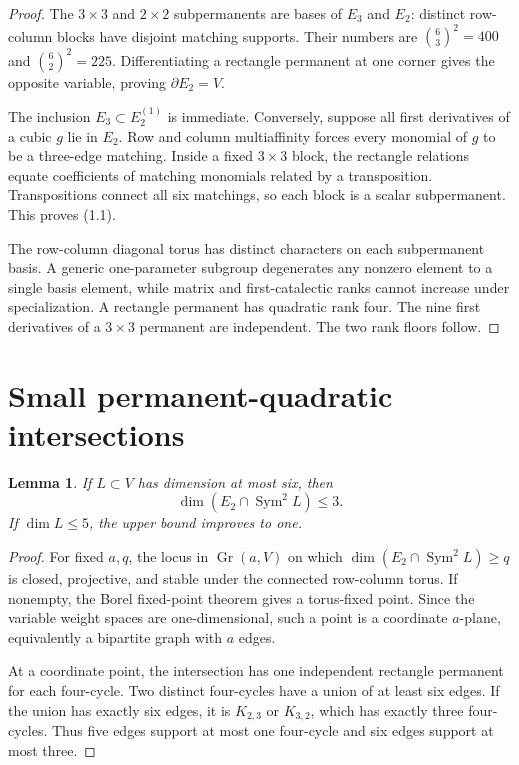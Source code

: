 \documentclass[11pt]{amsart}
\newcommand{\Sym}{\operatorname{Sym}}
\newtheorem{lemma}[theorem]{Lemma}
\theoremstyle{definition}
\begin{document}
\begin{proof}
The \(3\times3\) and \(2\times2\) subpermanents are bases of \(E_3\) and
\(E_2\): distinct row-column blocks have disjoint matching supports. Their
numbers are \(\binom63^2=400\) and \(\binom62^2=225\). Differentiating a
rectangle permanent at one corner gives the opposite variable, proving
\(\partial E_2=V\).

The inclusion \(E_3\subset E_2^{(1)}\) is immediate. Conversely, suppose
all first derivatives of a cubic \(g\) lie in \(E_2\). Row and column
multiaffinity forces every monomial of \(g\) to be a three-edge matching.
Inside a fixed \(3\times3\) block, the rectangle relations equate
coefficients of matching monomials related by a transposition. Transpositions
connect all six matchings, so each block is a scalar subpermanent. This proves
(1.1).

The row-column diagonal torus has distinct characters on each subpermanent
basis. A generic one-parameter subgroup degenerates any nonzero element to a
single basis element, while matrix and first-catalectic ranks cannot increase
under specialization. A rectangle permanent has quadratic rank four. The
nine first derivatives of a \(3\times3\) permanent are independent. The two
rank floors follow.
\end{proof}

\section{Small permanent-quadratic intersections}

\begin{lemma}\label{lem:small-intersection}
If \(L\subset V\) has dimension at most six, then
\[
 \dim(E_2\cap\Sym^2L)\le3.
\]
If \(\dim L\le5\), the upper bound improves to one.
\end{lemma}

\begin{proof}
For fixed \(a,q\), the locus in \(\operatorname{Gr}(a,V)\) on which
\(\dim(E_2\cap\Sym^2L)\ge q\) is closed, projective, and stable under the
connected row-column torus. If nonempty, the Borel fixed-point theorem gives
a torus-fixed point. Since the variable weight spaces are one-dimensional,
such a point is a coordinate \(a\)-plane, equivalently a bipartite graph with
\(a\) edges.

At a coordinate point, the intersection has one independent rectangle
permanent for each four-cycle. Two distinct four-cycles have a union of at
least six edges. If the union has exactly six edges, it is \(K_{2,3}\) or
\(K_{3,2}\), which has exactly three four-cycles. Thus five edges support at
most one four-cycle and six edges support at most three.
\end{proof}
\end{document}
